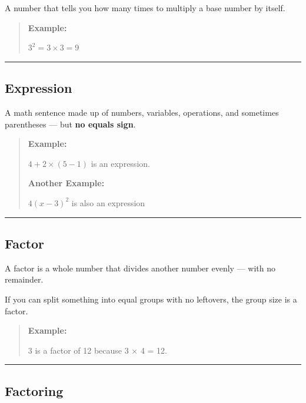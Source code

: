 \documentclass[
  letterpaper,
  DIV=11,
  numbers=noendperiod]{scrreprt}
\begin{document}
A number that tells you how many times to multiply a base number by
itself.

\begin{quote}
\textbf{Example:}

\(3^2 = 3 \times 3 = 9\)
\end{quote}

\begin{center}\rule{0.5\linewidth}{0.5pt}\end{center}

\subsection*{Expression}\label{glossary-expression}

A math sentence made up of numbers, variables, operations, and sometimes
parentheses --- but \textbf{no equals sign}.

\begin{quote}
\textbf{Example:}

\(4 + 2 \times (5 - 1)\) is an expression.

\textbf{Another Example:}

\(4(x-3)^2\) is also an expression
\end{quote}

\begin{center}\rule{0.5\linewidth}{0.5pt}\end{center}

\subsection*{Factor}\label{glossary-factor}

A factor is a whole number that divides another number evenly --- with
no remainder.

If you can split something into equal groups with no leftovers, the
group size is a factor.

\begin{quote}
\textbf{Example:}

3 is a factor of 12 because 3 × 4 = 12.
\end{quote}

\begin{center}\rule{0.5\linewidth}{0.5pt}\end{center}

\subsection*{Factoring}\label{glossary-factoring}
\end{document}
